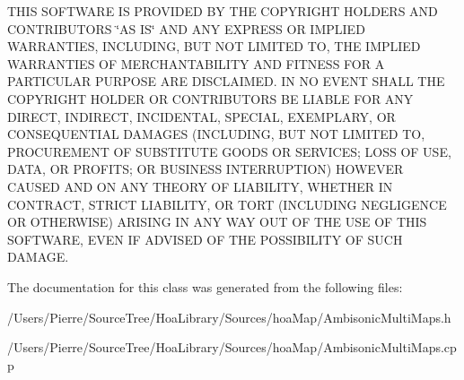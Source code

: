 T\-H\-I\-S S\-O\-F\-T\-W\-A\-R\-E I\-S P\-R\-O\-V\-I\-D\-E\-D B\-Y T\-H\-E C\-O\-P\-Y\-R\-I\-G\-H\-T H\-O\-L\-D\-E\-R\-S A\-N\-D C\-O\-N\-T\-R\-I\-B\-U\-T\-O\-R\-S \char`\"{}\-A\-S I\-S\char`\"{} A\-N\-D A\-N\-Y E\-X\-P\-R\-E\-S\-S O\-R I\-M\-P\-L\-I\-E\-D W\-A\-R\-R\-A\-N\-T\-I\-E\-S, I\-N\-C\-L\-U\-D\-I\-N\-G, B\-U\-T N\-O\-T L\-I\-M\-I\-T\-E\-D T\-O, T\-H\-E I\-M\-P\-L\-I\-E\-D W\-A\-R\-R\-A\-N\-T\-I\-E\-S O\-F M\-E\-R\-C\-H\-A\-N\-T\-A\-B\-I\-L\-I\-T\-Y A\-N\-D F\-I\-T\-N\-E\-S\-S F\-O\-R A P\-A\-R\-T\-I\-C\-U\-L\-A\-R P\-U\-R\-P\-O\-S\-E A\-R\-E D\-I\-S\-C\-L\-A\-I\-M\-E\-D. I\-N N\-O E\-V\-E\-N\-T S\-H\-A\-L\-L T\-H\-E C\-O\-P\-Y\-R\-I\-G\-H\-T H\-O\-L\-D\-E\-R O\-R C\-O\-N\-T\-R\-I\-B\-U\-T\-O\-R\-S B\-E L\-I\-A\-B\-L\-E F\-O\-R A\-N\-Y D\-I\-R\-E\-C\-T, I\-N\-D\-I\-R\-E\-C\-T, I\-N\-C\-I\-D\-E\-N\-T\-A\-L, S\-P\-E\-C\-I\-A\-L, E\-X\-E\-M\-P\-L\-A\-R\-Y, O\-R C\-O\-N\-S\-E\-Q\-U\-E\-N\-T\-I\-A\-L D\-A\-M\-A\-G\-E\-S (I\-N\-C\-L\-U\-D\-I\-N\-G, B\-U\-T N\-O\-T L\-I\-M\-I\-T\-E\-D T\-O, P\-R\-O\-C\-U\-R\-E\-M\-E\-N\-T O\-F S\-U\-B\-S\-T\-I\-T\-U\-T\-E G\-O\-O\-D\-S O\-R S\-E\-R\-V\-I\-C\-E\-S; L\-O\-S\-S O\-F U\-S\-E, D\-A\-T\-A, O\-R P\-R\-O\-F\-I\-T\-S; O\-R B\-U\-S\-I\-N\-E\-S\-S I\-N\-T\-E\-R\-R\-U\-P\-T\-I\-O\-N) H\-O\-W\-E\-V\-E\-R C\-A\-U\-S\-E\-D A\-N\-D O\-N A\-N\-Y T\-H\-E\-O\-R\-Y O\-F L\-I\-A\-B\-I\-L\-I\-T\-Y, W\-H\-E\-T\-H\-E\-R I\-N C\-O\-N\-T\-R\-A\-C\-T, S\-T\-R\-I\-C\-T L\-I\-A\-B\-I\-L\-I\-T\-Y, O\-R T\-O\-R\-T (I\-N\-C\-L\-U\-D\-I\-N\-G N\-E\-G\-L\-I\-G\-E\-N\-C\-E O\-R O\-T\-H\-E\-R\-W\-I\-S\-E) A\-R\-I\-S\-I\-N\-G I\-N A\-N\-Y W\-A\-Y O\-U\-T O\-F T\-H\-E U\-S\-E O\-F T\-H\-I\-S S\-O\-F\-T\-W\-A\-R\-E, E\-V\-E\-N I\-F A\-D\-V\-I\-S\-E\-D O\-F T\-H\-E P\-O\-S\-S\-I\-B\-I\-L\-I\-T\-Y O\-F S\-U\-C\-H D\-A\-M\-A\-G\-E. 

The documentation for this class was generated from the following files\-:\begin{DoxyCompactItemize}
\item 
/\-Users/\-Pierre/\-Source\-Tree/\-Hoa\-Library/\-Sources/hoa\-Map/Ambisonic\-Multi\-Maps.\-h\item 
/\-Users/\-Pierre/\-Source\-Tree/\-Hoa\-Library/\-Sources/hoa\-Map/Ambisonic\-Multi\-Maps.\-cpp\end{DoxyCompactItemize}
